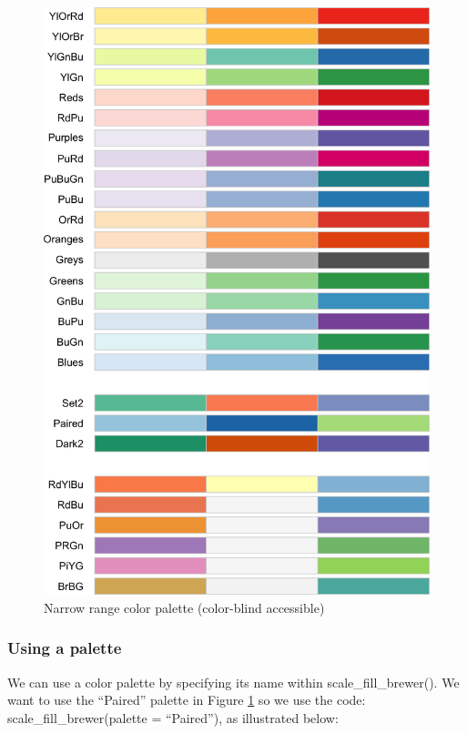 \documentclass[
]{krantz}
\begin{document}
\begin{figure}
\includegraphics[width=0.7\linewidth,height=0.7\textheight]{ch_graphing/images/colors_3} \caption{Narrow range color palette (color-blind accessible)}\label{fig:colorspalthree}
\end{figure}

\newpage

\hypertarget{using-a-palette}{%
\subsubsection{Using a palette}\label{using-a-palette}}

We can use a color palette by specifying its name within scale\_fill\_brewer(). We want to use the ``Paired'' palette in Figure \ref{fig:colorspalthree} so we use the code: scale\_fill\_brewer(palette = ``Paired''), as illustrated below:
\end{document}
